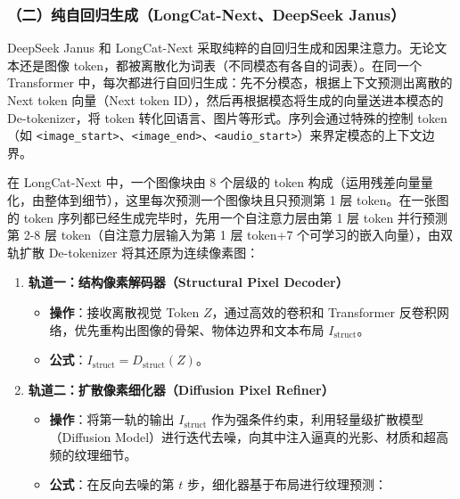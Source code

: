 \hypertarget{ux4e8cux7eafux81eaux56deux5f52ux751fux6210longcat-nextdeepseek-janus}{%
\subsubsection{（二）纯自回归生成（LongCat-Next、DeepSeek Janus）}\label{ux4e8cux7eafux81eaux56deux5f52ux751fux6210longcat-nextdeepseek-janus}}

DeepSeek Janus 和 LongCat-Next 采取纯粹的自回归生成和因果注意力。无论文本还是图像 token，都被离散化为词表（不同模态有各自的词表）。在同一个 Transformer 中，每次都进行自回归生成：先不分模态，根据上下文预测出离散的 Next token 向量（Next token ID），然后再根据模态将生成的向量送进本模态的 De-tokenizer，将 token 转化回语言、图片等形式。序列会通过特殊的控制 token（如 \texttt{\textless{}image\_start\textgreater{}}、\texttt{\textless{}image\_end\textgreater{}}、\texttt{\textless{}audio\_start\textgreater{}}）来界定模态的上下文边界。

在 LongCat-Next 中，一个图像块由 8 个层级的 token 构成（运用残差向量量化，由整体到细节），这里每次预测一个图像块且只预测第 1 层 token。在一张图的 token 序列都已经生成完毕时，先用一个自注意力层由第 1 层 token 并行预测第 2-8 层 token（自注意力层输入为第 1 层 token+7 个可学习的嵌入向量），由双轨扩散 De-tokenizer 将其还原为连续像素图：

\begin{enumerate}
\def\labelenumi{\arabic{enumi}.}
\item
  \textbf{轨道一：结构像素解码器（Structural Pixel Decoder）}

  \begin{itemize}
  \tightlist
  \item
    \textbf{操作}：接收离散视觉 Token \(Z\)，通过高效的卷积和 Transformer 反卷积网络，优先重构出图像的骨架、物体边界和文本布局 \(I_{\mathrm{struct}}\)。
  \item
    \textbf{公式}：\(I_{\mathrm{struct}}=D_{\mathrm{struct}}(Z)\)。
  \end{itemize}
\item
  \textbf{轨道二：扩散像素细化器（Diffusion Pixel Refiner）}

  \begin{itemize}
  \tightlist
  \item
    \textbf{操作}：将第一轨的输出 \(I_{\mathrm{struct}}\) 作为强条件约束，利用轻量级扩散模型（Diffusion Model）进行迭代去噪，向其中注入逼真的光影、材质和超高频的纹理细节。
  \item
    \textbf{公式}：在反向去噪的第 \(t\) 步，细化器基于布局进行纹理预测：
  \end{itemize}
\end{enumerate}

